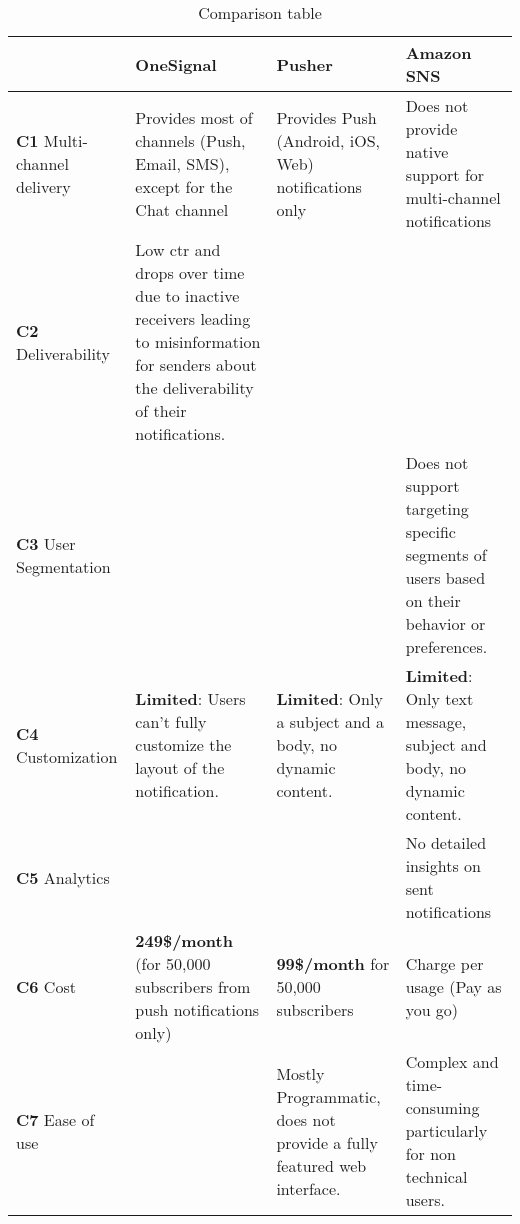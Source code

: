 \begin{table}[hbt!]
    \centering
    \begin{tabularx}{\textwidth}{ |
        >{\raggedright\arraybackslash} X | 
        >{\raggedright\arraybackslash} X |
        >{\raggedright\arraybackslash} X | 
        >{\raggedright\arraybackslash} X | 
        }
        \hline
         & \textbf{OneSignal} & \textbf{Pusher} & \textbf{Amazon SNS}  \\
        \hline
        \textbf{C1} \linebreak Multi-channel delivery & Provides most of channels (Push, Email, SMS), except for the Chat channel & Provides Push 
        (Android, iOS, Web) notifications only
         & Does not provide native support for multi-channel notifications  \\
        \hline
        \textbf{C2} \linebreak Deliverability & Low \acrshort{ctr} and drops over time due to inactive receivers leading to misinformation for senders about the deliverability of their notifications.  &  &  \\
        \hline
        \textbf{C3} \linebreak User Segmentation & & & Does not support targeting specific segments of users based on their behavior or preferences. \\
        \hline
        \textbf{C4} \linebreak Customization & \textbf{Limited}: Users can’t fully customize the layout of the notification.  & \textbf{Limited}: Only a subject and a body, no dynamic content. & \textbf{Limited}: Only text message, subject and body, no dynamic content.
        \\
        \hline
        \textbf{C5} \linebreak Analytics  & & & No detailed insights on sent notifications \\
        \hline 
        \textbf{C6} \linebreak Cost & \textbf{249\$/month} (for 50,000 subscribers from push notifications only) & \textbf{99\$/month} for 50,000 subscribers & Charge per usage (Pay as you go) \\
        \hline
        \textbf{C7} \linebreak Ease of use & & Mostly Programmatic, does not provide a fully featured web interface. & Complex and time-consuming particularly for non technical users. \\
        \hline
     \end{tabularx}
    \caption{Comparison table}
\end{table}

